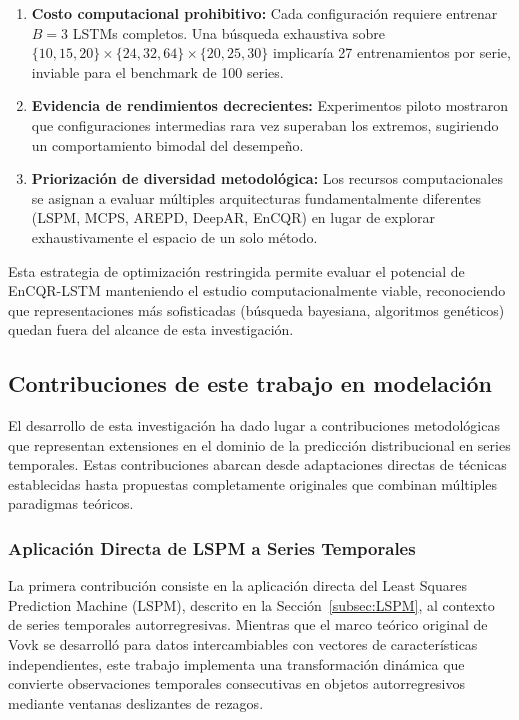 \begin{enumerate}
\item \textbf{Costo computacional prohibitivo:} Cada configuración requiere entrenar $B=3$ LSTMs completos. Una búsqueda exhaustiva sobre $\{10,15,20\} \times \{24,32,64\} \times \{20,25,30\}$ implicaría 27 entrenamientos por serie, inviable para el benchmark de 100 series.

\item \textbf{Evidencia de rendimientos decrecientes:} Experimentos piloto mostraron que configuraciones intermedias rara vez superaban los extremos, sugiriendo un comportamiento bimodal del desempeño.

\item \textbf{Priorización de diversidad metodológica:} Los recursos computacionales se asignan a evaluar múltiples arquitecturas fundamentalmente diferentes (LSPM, MCPS, AREPD, DeepAR, EnCQR) en lugar de explorar exhaustivamente el espacio de un solo método.
\end{enumerate}

Esta estrategia de optimización restringida permite evaluar el potencial de EnCQR-LSTM manteniendo el estudio computacionalmente viable, reconociendo que representaciones más sofisticadas (búsqueda bayesiana, algoritmos genéticos) quedan fuera del alcance de esta investigación.





\subsection{Contribuciones de este trabajo en modelación}

El desarrollo de esta investigación ha dado lugar a contribuciones metodológicas que representan extensiones en el dominio de la predicción distribucional en series temporales. Estas contribuciones abarcan desde adaptaciones directas de técnicas establecidas hasta propuestas completamente originales que combinan múltiples paradigmas teóricos.

\subsubsection{Aplicación Directa de LSPM a Series Temporales}

La primera contribución consiste en la aplicación directa del Least Squares Prediction Machine (LSPM), descrito en la Sección~\ref{subsec:LSPM}, al contexto de series temporales autorregresivas. Mientras que el marco teórico original de Vovk se desarrolló para datos intercambiables con vectores de características independientes, este trabajo implementa una transformación dinámica que convierte observaciones temporales consecutivas en objetos autorregresivos mediante ventanas deslizantes de rezagos.

